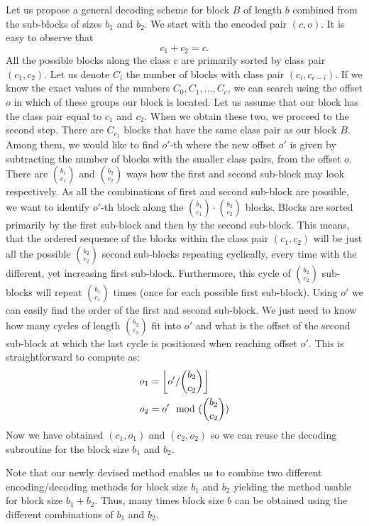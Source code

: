 Let us propose a general decoding scheme for block $B$ of length $b$ combined from the
sub-blocks of sizes $b_1$ and $b_2$. We start with the encoded pair $(c, o)$. It is easy
to observe that $$c_1 + c_2 = c.$$ All the possible blocks along the class $c$ are primarily
sorted by class pair $(c_1, c_2)$. Let us denote $C_i$ the number of blocks with class
pair $(c_i, c_{c-i})$. If we know the exact values of the numbers $C_0, C_1, \ldots , C_c$,
we can search using the offset $o$ in which of these groups our block is located. Let us
assume that our block has the class pair equal to $c_1$ and $c_2$. When we obtain these two,
we proceed to the second step. There are $C_{c_1}$ blocks that have the same class pair
as our block $B$. Among them, we would like to find $o'$-th where the new offset $o'$
is given by subtracting the number of blocks with the smaller class pairs, from the offset
$o$. There are ${b_1 \choose c_1}$ and ${b_2 \choose c_2}$ ways how the first and second
sub-block may look respectively. As all the combinations of first and second sub-block are
possible, we want to identify $o'$-th block along the ${b_1 \choose c_1}\cdot {b_2 \choose c_2}$
blocks. Blocks are sorted primarily by the first sub-block and then by the second sub-block.
This means, that the ordered sequence of the blocks within the class pair $(c_1, c_2)$ will be
just all the possible ${b_2 \choose c_2}$ second sub-blocks repeating cyclically, every time
with the different, yet increasing first sub-block. Furthermore, this cycle of
${b_2 \choose c_2}$ sub-blocks will repeat ${b_1 \choose c_1}$ times (once for each possible
first sub-block). Using $o'$ we can easily find the order of the first and second sub-block.
We just need to know how many cycles of length ${b_2 \choose c_2}$ fit into $o'$ and what is
the offset of the second sub-block at which the last cycle is positioned when reaching 
offset $o'$. This is straightforward to compute as:
\begin{align*}
    o_1 &= \floor{o'/{b_2 \choose c_2}} \\
    o_2 &= o'\mod ({b_2 \choose c_2})\\ %
\end{align*}
Now we have obtained $(c_1, o_1)$ and $(c_2, o_2)$ so we can reuse the decoding subroutine for the
block size $b_1$ and $b_2$.

Note that our newly devised method enables us to combine two different encoding/decoding methods
for block size $b_1$ and $b_2$ yielding the method usable for block size $b_1+b_2$. Thus, many
times block size $b$ can be obtained using the different combinations of $b_1$ and $b_2$.

